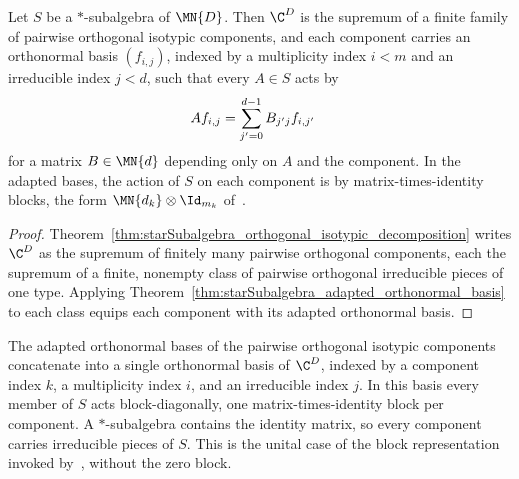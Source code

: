 \begin{theorem}%
    \label{thm:starSubalgebra_isotypic_tensor_factorization}
    \leanok
     Let $S$ be a $*$-subalgebra of $\MN{D}$. Then $\C^D$ is the supremum
    of a finite family of pairwise orthogonal isotypic components, and each component carries an orthonormal basis $(f_{i,j})$, indexed by a
    multiplicity index $i<m$ and an irreducible index $j<d$, such that every $A\in S$ acts by
    \begin{align}
        A f_{i,j}
        &=\sum_{j'=0}^{d-1}B_{j'j}f_{i,j'}
        \notag
    \end{align}
    for a matrix $B\in\MN{d}$ depending only on $A$ and the component. In the adapted bases, the action of $S$ on each component is by
    matrix-times-identity blocks, the form $\MN{d_k}\otimes\Id_{m_k}$ of~\cite[Theorem~6.14]{Wolf2012Quantum}.
\end{theorem}

\begin{proof}
    \leanok
     Theorem~\ref{thm:starSubalgebra_orthogonal_isotypic_decomposition}
    writes $\C^D$ as the supremum of finitely many pairwise orthogonal components, each the supremum of a finite, nonempty class of pairwise
    orthogonal irreducible pieces of one type. Applying Theorem~\ref{thm:starSubalgebra_adapted_orthonormal_basis} to each class
    equips each component with its adapted orthonormal basis.
\end{proof}

The adapted orthonormal bases of the pairwise orthogonal isotypic components concatenate into a single orthonormal basis of $\C^D$, indexed by a
component index $k$, a multiplicity index $i$, and an irreducible index $j$. In this basis every member of $S$ acts block-diagonally, one
matrix-times-identity block per component. A $*$-subalgebra contains the identity matrix, so every component carries irreducible pieces of $S$. This
is the unital case of the block representation invoked by~\cite[Theorem~6.14]{Wolf2012Quantum}, without the zero block.


